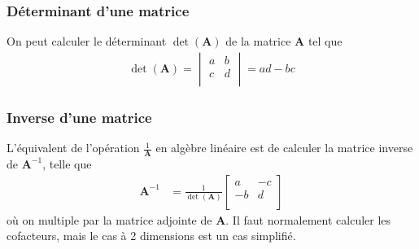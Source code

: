 \documentclass[french, landscape]{article}
\begin{document}
\begin{multicols*}{3}
\subsubsection*{Déterminant d'une matrice} On peut calculer le déterminant $\det(\bm{A})$ de la matrice $\bm{A}$ tel que
\begin{align*}
\det(\bm{A})	  = 
\begin{vmatrix}
a	& b \\
c	& d \\
\end{vmatrix}
= ad - bc
\end{align*}

\subsubsection*{Inverse d'une matrice} L'équivalent de l'opération $\frac{1}{\bm{A}}$ en algèbre linéaire est de calculer la matrice inverse de $\bm{A}^{-1}$, telle que
\begin{align*}
\bm{A}^{-1}	& = \frac{1}{\det(\bm{A})}
\begin{bmatrix}
a	& -c \\
-b	& d \\
\end{bmatrix}
\end{align*}
où on multiple par la matrice adjointe de $\bm{A}$. Il faut normalement calculer les cofacteurs, mais le cas à 2 dimensions est un cas simplifié.



\end{multicols*}


\end{document}
